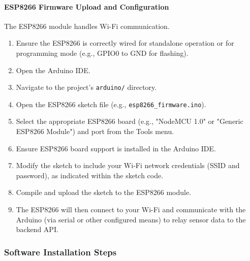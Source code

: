 \paragraph*{ESP8266 Firmware Upload and Configuration}
The ESP8266 module handles Wi-Fi communication.
\begin{enumerate}
    \item Ensure the ESP8266 is correctly wired for standalone operation or for programming mode (e.g., GPIO0 to GND for flashing).
    \item Open the Arduino IDE.
    \item Navigate to the project's \texttt{arduino/} directory.
    \item Open the ESP8266 sketch file (e.g., \texttt{esp8266\_firmware.ino}).
    \item Select the appropriate ESP8266 board (e.g., "NodeMCU 1.0" or "Generic ESP8266 Module") and port from the Tools menu.
    \item Ensure ESP8266 board support is installed in the Arduino IDE.
    \item Modify the sketch to include your Wi-Fi network credentials (SSID and password), as indicated within the sketch code.
    \item Compile and upload the sketch to the ESP8266 module.
    \item The ESP8266 will then connect to your Wi-Fi and communicate with the Arduino (via serial or other configured means) to relay sensor data to the backend API.
\end{enumerate}

\subsubsection*{Software Installation Steps}

